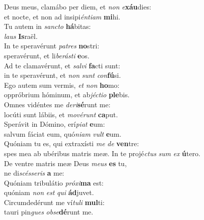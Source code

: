 \evenverse Deus meus, clamábo per diem, et \textit{non} \textit{e}\textbf{xáu}dies:~\*\\
\evenverse et nocte, et non ad insipi\textit{én}\textit{ti}\textit{am} \textbf{mi}hi.\\
\oddverse Tu autem in \textit{san}\textit{cto} \textbf{há}bitas:~\*\\
\oddverse \textit{laus} \textbf{Is}raël.\\
\evenverse In te speravérunt \textit{pa}\textit{tres} \textbf{no}stri:~\*\\
\evenverse speravérunt, et li\textit{be}\textit{rá}\textit{sti} \textbf{e}os.\\
\oddverse Ad te clamavérunt, et \textit{sal}\textit{vi} \textbf{fa}cti sunt:~\*\\
\oddverse in te speravérunt, et \textit{non} \textit{sunt} \textit{con}\textbf{fú}si.\\
\evenverse Ego autem sum vermis, \textit{et} \textit{non} \textbf{ho}mo:~\*\\
\evenverse oppróbrium hóminum, et ab\textit{jé}\textit{cti}\textit{o} \textbf{ple}bis.\\
\oddverse Omnes vidéntes me \textit{de}\textit{ri}\textbf{sé}runt me:~\*\\
\oddverse locúti sunt lábiis, et \textit{mo}\textit{vé}\textit{runt} \textbf{ca}put.\\
\evenverse Sperávit in Dómino, erí\textit{pi}\textit{at} \textbf{e}um:~\*\\
\evenverse salvum fáciat eum, quó\textit{ni}\textit{am} \textit{vult} \textbf{e}um.\\
\oddverse Quóniam tu es, qui extraxísti \textit{me} \textit{de} \textbf{ven}tre:~\*\\
\oddverse spes mea ab ubéribus matris meæ. In te projé\textit{ctus} \textit{sum} \textit{ex} \textbf{ú}tero.\\
\evenverse De ventre matris meæ Deus \textit{me}\textit{us} \textbf{es} tu,~\*\\
\evenverse ne di\textit{scés}\textit{se}\textit{ris} \textbf{a} me:\\
\oddverse Quóniam tribulátio \textit{pró}\textit{xi}\textbf{ma} est:~\*\\
\oddverse quóniam \textit{non} \textit{est} \textit{qui} \textbf{ád}juvet.\\
\evenverse Circumdedérunt me ví\textit{tu}\textit{li} \textbf{mul}ti:~\*\\
\evenverse tauri pin\textit{gues} \textit{ob}\textit{se}\textbf{dé}runt me.\\
